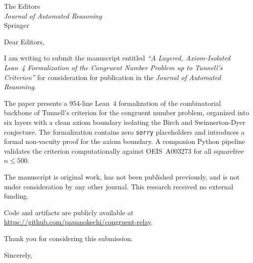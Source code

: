 \documentclass[11pt,a4paper]{letter}
\date{April 26, 2026}
\begin{document}
\begin{letter}{%
  The Editors \\
  \emph{Journal of Automated Reasoning} \\
  Springer}

\opening{Dear Editors,}

I am writing to submit the manuscript entitled
\emph{``A Layered, Axiom-Isolated Lean~4 Formalization of the
Congruent Number Problem up to Tunnell's Criterion''}
for consideration for publication in the
\emph{Journal of Automated Reasoning}.

The paper presents a 954-line Lean~4 formalization of the
combinatorial backbone of Tunnell's criterion for the congruent
number problem, organized into six layers with a clean axiom
boundary isolating the Birch and Swinnerton-Dyer conjecture.
The formalization contains zero \texttt{sorry} placeholders and
introduces a formal non-vacuity proof for the axiom boundary.
A companion Python pipeline validates the criterion computationally
against OEIS~A003273 for all squarefree~$n \le 500$.

The manuscript is original work, has not been published previously,
and is not under consideration by any other journal.
This research received no external funding.

Code and artifacts are publicly available at
\url{https://github.com/papanokechi/congruent-relay}.

Thank you for considering this submission.

\closing{Sincerely,}

\end{letter}
\end{document}
